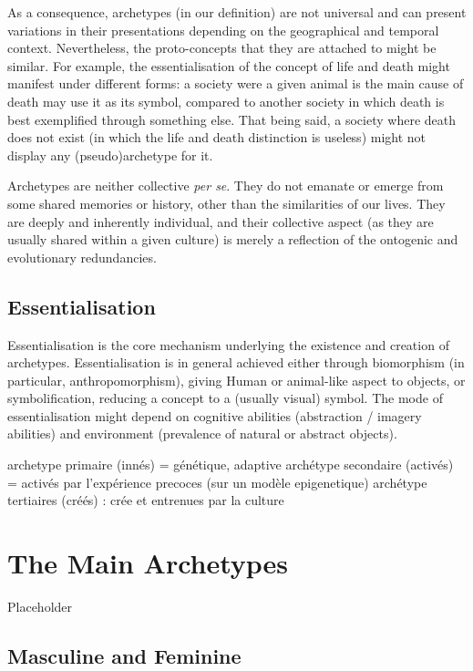 \documentclass[
]{book}
\begin{document}
As a consequence, archetypes (in our definition) are not universal and can present variations in their presentations depending on the geographical and temporal context. Nevertheless, the proto-concepts that they are attached to might be similar. For example, the essentialisation of the concept of life and death might manifest under different forms: a society were a given animal is the main cause of death may use it as its symbol, compared to another society in which death is best exemplified through something else. That being said, a society where death does not exist (in which the life and death distinction is useless) might not display any (pseudo)archetype for it.

Archetypes are neither collective \emph{per se}. They do not emanate or emerge from some shared memories or history, other than the similarities of our lives. They are deeply and inherently individual, and their collective aspect (as they are usually shared within a given culture) is merely a reflection of the ontogenic and evolutionary redundancies.

\hypertarget{essentialisation}{%
\section{Essentialisation}\label{essentialisation}}

Essentialisation is the core mechanism underlying the existence and creation of archetypes. Essentialisation is in general achieved either through biomorphism (in particular, anthropomorphism), giving Human or animal-like aspect to objects, or symbolification, reducing a concept to a (usually visual) symbol. The mode of essentialisation might depend on cognitive abilities (abstraction / imagery abilities) and environment (prevalence of natural or abstract objects).

archetype primaire (innés) = génétique, adaptive
archétype secondaire (activés) = activés par l'expérience precoces (sur un modèle epigenetique)
archétype tertiaires (créés) : crée et entrenues par la culture

\hypertarget{the-main-archetypes}{%
\chapter{The Main Archetypes}\label{the-main-archetypes}}

Placeholder

\hypertarget{masculine-and-feminine}{%
\section{Masculine and Feminine}\label{masculine-and-feminine}}
\end{document}
